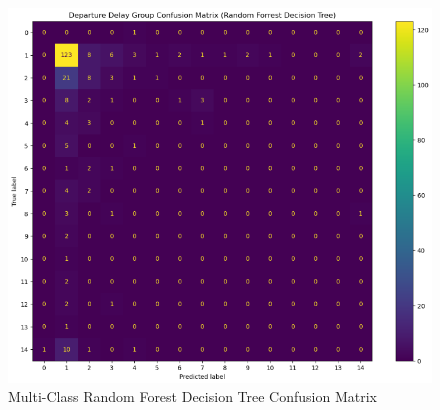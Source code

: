 \documentclass[a4paper,12pt]{article}
\begin{document}
\begin{figure}[!]
    \centering
    \includegraphics*[scale=.50]{../../img/model_rq2_cfmtrx_4.png}
    \caption[]{Multi-Class Random Forest Decision Tree Confusion Matrix}
    \label{fig:model:rq2:cfmtrx_4}
\end{figure}
\end{document}
